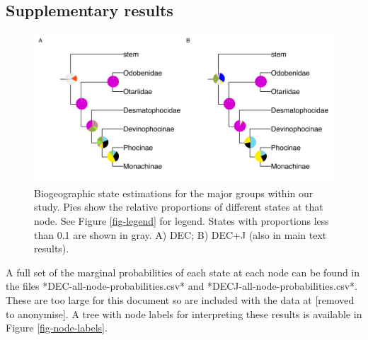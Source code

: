 \documentclass[a4paper, 12pt]{article}
\begin{document}
\subsection{Supplementary results}

\begin{figure}[H]
 \centering
  \includegraphics[width = \linewidth]{figures/biogeography-insets-two.png}
  \caption{Biogeographic state estimations for the major groups within our study. Pies show the relative proportions of different states at that node. See Figure \ref{fig-legend} for legend. States with proportions less than 0.1 are shown in gray. A) DEC; B) DEC+J (also in main text results).}
  \label{fig-nodes}
\end{figure} 



A full set of the marginal probabilities of each state at each node can be found in the files *DEC-all-node-probabilities.csv* and 
*DECJ-all-node-probabilities.csv*. These are too large for this document so are included with the data at [removed to anonymise]. A tree with node labels for interpreting these results is available in Figure \ref{fig-node-labels}.
\end{document}
